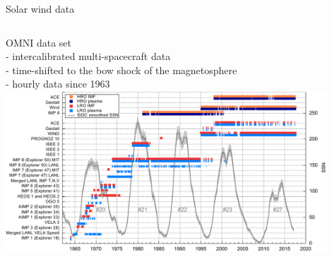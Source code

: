 \begin{frame}[plain,c]{Solar wind data}{}
	\begin{columns}[c]
	\column{\textwidth}
		
		OMNI data set \citep{King2005}\\
		- intercalibrated multi-spacecraft data\\
		- time-shifted to the bow shock of the magnetosphere\\
		- hourly data since 1963\\
		\centering
		\includegraphics[width=0.9\textwidth]{../figures_of_mine/gnuplots/timeline_OMNI_SC_IDs.pdf}
		
		
	\end{columns}
\end{frame}

